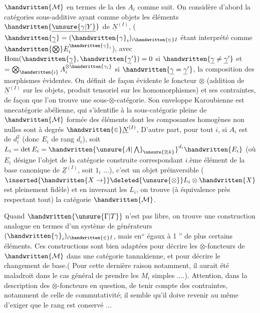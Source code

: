 $\handwritten{\mathcal{M}}$ en termes de la  des $A_i$  comme suit. On considère d'abord la catégories sous-additive  ayant comme objets les éléments $\handwritten{\underline{\unsure{\gamma|Y}}}$ de $\underline{N}^{(I)}$, ($\handwritten{\underline{\gamma}}=(\handwritten{\gamma}_i)_{i\handwritten{\in}I}$ étant interprété comme $\handwritten{\bigotimes}E_i^{\handwritten{\gamma}_i}$),  avec $\operatorname{Hom}(\handwritten{\underline{\gamma}},\handwritten{\underline{\gamma}'})=0$ si $\handwritten{\underline{\gamma}\ne\underline{\gamma}'}$ et $=\bigotimes_{\handwritten{i}} A_i^{\otimes\handwritten{\gamma_i}}$ si $\handwritten{\underline{\gamma}=\underline{\gamma}'}$, la composition des morphismes évidentes. On définit de façon évidente le foncteur $\otimes$ (addition de $\underline{N}^{(I)}$ sur les objets, produit tensoriel sur les homomorphismes) et ses contraintes, de façon que l'on trouve une sous-$\otimes$-catégorie. Son enveloppe Karoubienne est une\inserted{$\otimes$-}catégorie abélienne, qui s'identifie à la sous-catégorie pleine de $\handwritten{\mathcal{M}}$ formée des éléments dont les composantes homogènes non nulles sont à degrés $\handwritten{\in}\underline{N}^{(I)}$, D'autre part, pour tout $i$, si $A_i$ est de  $d_i^2$ (donc $E_i$ de rang $d_i$), soit $L_i=\det E_i={\handwritten{\unsure{A|\bigwedge}_{\unsure{2|k}}}}^{d_i}\handwritten{E_i}$ (où $E_i$ désigne l'objet de la catégorie construite correspondant  $i$.ème élément de la base canonique de $\underline{Z}^{(I)}$, soit $1_i$ ...), c'est un objet préinversible ($\inserted{\handwritten{X\to}}\deleted{\unsure{\otimes}}L_i\otimes\handwritten{X}$ est pleinement fidèle) et en inversant les $L_i$, on trouve (à équivalence près\deleted{)} respectant tout) la catégorie $\handwritten{\mathcal{M}}$.

Quand $\handwritten{\unsure{\Gamma|T}}$ n'est pas libre, on trouve une construction analogue en termes d'un système de générateurs $(\handwritten{\gamma}_i)_{i\handwritten{\in}I}$, mais en``  égaux à 1 '' de plus certains éléments. Ces constructions sont bien adaptées pour décrire les $\otimes$-foncteurs de $\handwritten{\mathcal{M}}$ dans une \deleted{$\otimes$-}catégorie tannakienne, et pour décrire le changement de base.( Pour cette dernière raison notamment, il aurait été maladroit dans le cas général de prendre les $M_i$ simples ....). Attention, dans la description des $\otimes$-foncteurs en question, de tenir compte des contraintes, notamment de celle de commutativité; il semble qu'il doive revenir au même d'exiger que le rang est conservé ...
